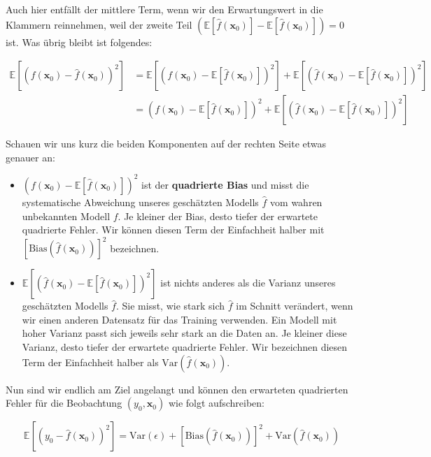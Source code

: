 \documentclass[
]{book}
\providecommand{\tightlist}{%
  \setlength{\itemsep}{0pt}\setlength{\parskip}{0pt}}
\begin{document}
Auch hier entfällt der mittlere Term, wenn wir den Erwartungswert in die Klammern reinnehmen, weil der zweite Teil \(\left(\mathbb{E}\left[\hat{f}(\mathbf{x}_0)\right] - \mathbb{E}\left[\hat{f}(\mathbf{x}_0)\right]\right)=0\) ist. Was übrig bleibt ist folgendes:

\begin{align}
\mathbb{E}\left[(f(\mathbf{x}_0) - \hat{f}(\mathbf{x}_0))^2\right] &= \mathbb{E}\left[\left(f(\mathbf{x}_0) - \mathbb{E}\left[\hat{f}(\mathbf{x}_0)\right]\right)^2\right] + \mathbb{E}\left[\left(\hat{f}(\mathbf{x}_0) - \mathbb{E}\left[\hat{f}(\mathbf{x}_0)\right]\right)^2\right] \\
&= \left(f(\mathbf{x}_0) - \mathbb{E}\left[\hat{f}(\mathbf{x}_0)\right]\right)^2 + \mathbb{E}\left[\left(\hat{f}(\mathbf{x}_0) - \mathbb{E}\left[\hat{f}(\mathbf{x}_0)\right]\right)^2\right]
\end{align}

Schauen wir uns kurz die beiden Komponenten auf der rechten Seite etwas genauer an:

\begin{itemize}
\tightlist
\item
  \(\left(f(\mathbf{x}_0) - \mathbb{E}\left[\hat{f}(\mathbf{x}_0)\right]\right)^2\) ist der \textbf{quadrierte Bias} und misst die systematische Abweichung unseres geschätzten Modells \(\hat{f}\) vom wahren unbekannten Modell \(f\). Je kleiner der Bias, desto tiefer der erwartete quadrierte Fehler. Wir können diesen Term der Einfachheit halber mit \(\left[\text{Bias}\left(\hat{f}(\mathbf{x}_0)\right)\right]^2\) bezeichnen.
\item
  \(\mathbb{E}\left[\left(\hat{f}(\mathbf{x}_0) - \mathbb{E}\left[\hat{f}(\mathbf{x}_0)\right]\right)^2\right]\) ist nichts anderes als die Varianz unseres geschätzten Modells \(\hat{f}\). Sie misst, wie stark sich \(\hat{f}\) im Schnitt verändert, wenn wir einen anderen Datensatz für das Training verwenden. Ein Modell mit hoher Varianz passt sich jeweils sehr stark an die Daten an. Je kleiner diese Varianz, desto tiefer der erwartete quadrierte Fehler. Wir bezeichnen diesen Term der Einfachheit halber als \(\text{Var}\left(\hat{f}(\mathbf{x}_0)\right)\).
\end{itemize}

Nun sind wir endlich am Ziel angelangt und können den erwarteten quadrierten Fehler für die Beobachtung \((y_0,\mathbf{x}_0)\) wie folgt aufschreiben:

\[
\mathbb{E}\left[\left(y_0 - \hat{f}(\mathbf{x}_0)\right)^2\right] = \text{Var}(\epsilon) + \left[\text{Bias}\left(\hat{f}(\mathbf{x}_0)\right)\right]^2 + \text{Var}\left(\hat{f}(\mathbf{x}_0)\right)
\]
\end{document}
